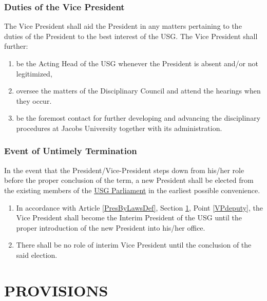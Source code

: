 \documentclass[12pt]{LaTeX_Misc/constitution}
\begin{document}
\section{Duties of the Vice President}
\label{VPDef}
The Vice President shall aid the President in any matters pertaining to the duties of the President to the best interest of the USG. The Vice President shall further:
\begin{enumerate}
\item \label{VPdeputy} be the Acting Head of the USG whenever the President is absent and/or not legitimized,
\item oversee the matters of the Disciplinary Council and attend the hearings when they occur. \item be the foremost contact for further developing and advancing the disciplinary procedures at Jacobs University together with its administration.
\end{enumerate}


\section{Event of Untimely Termination}
In the event that the President/Vice-President steps down from his/her role before the proper conclusion of the term, a new President shall be elected from the existing members of the \hyperref[USGParliamentDef]{USG Parliament} in the earliest possible convenience. 
\begin{enumerate}[label={\textbf{\S\arabic*}}]
\item In accordance with Article \ref{PresByLawsDef}, Section \ref{VPDef}, Point \ref{VPdeputy}, the Vice President shall become the Interim President of the USG until the proper introduction of the new President into his/her office.
\item There shall be no role of interim Vice President until the conclusion of the said election. 
\end{enumerate}






\part{PROVISIONS}
\label{PartC}

\end{document}
